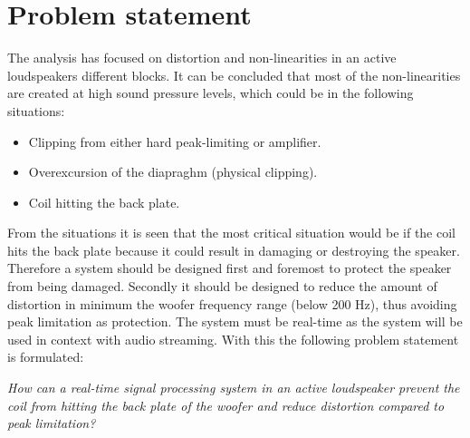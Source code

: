 





%

%

%

%

%

\section{Problem statement} \label{sec:problem_statement}
The analysis has focused on distortion and non-linearities in an active loudspeakers different blocks. It can be concluded that most of the non-linearities are created at high sound pressure levels, which could be in the following situations:
\begin{itemize}
\item Clipping from either hard peak-limiting or amplifier.
\item Overexcursion of the diapraghm (physical clipping). 
\item Coil hitting the back plate. 
\end{itemize}

From the situations it is seen that the most critical situation would be if the coil hits the back plate because it could result in damaging or destroying the speaker. Therefore a system should be designed first and foremost to protect the speaker from being damaged. Secondly it should be designed to reduce the amount of distortion in minimum the woofer frequency range (below 200 Hz), thus avoiding peak limitation as protection. The system must be real-time as the system will be used in context with audio streaming. With this the following problem statement is formulated:

\begin{center}
\label{ProblemStatement}
\textit{How can a real-time signal processing system in an active loudspeaker prevent the coil from hitting the back plate of the woofer and reduce distortion compared to peak limitation?}
\end{center}

